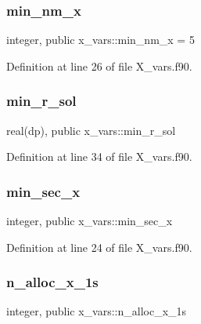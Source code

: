\subsubsection{\texorpdfstring{min\+\_\+nm\+\_\+x}{min\_nm\_x}}
{\footnotesize\ttfamily integer, public x\+\_\+vars\+::min\+\_\+nm\+\_\+x = 5}



Definition at line 26 of file X\+\_\+vars.\+f90.

\mbox{\label{namespacex__vars_a50c610efcf5afa4ec4b0eb7119b5d520}} 
\subsubsection{\texorpdfstring{min\+\_\+r\+\_\+sol}{min\_r\_sol}}
{\footnotesize\ttfamily real(dp), public x\+\_\+vars\+::min\+\_\+r\+\_\+sol}



Definition at line 34 of file X\+\_\+vars.\+f90.

\mbox{\label{namespacex__vars_a0d63825aabc4c71623c6ea7ffe033949}} 
\subsubsection{\texorpdfstring{min\+\_\+sec\+\_\+x}{min\_sec\_x}}
{\footnotesize\ttfamily integer, public x\+\_\+vars\+::min\+\_\+sec\+\_\+x}



Definition at line 24 of file X\+\_\+vars.\+f90.

\mbox{\label{namespacex__vars_af565ad5c65071b130e69d528aa6faf1d}} 
\subsubsection{\texorpdfstring{n\+\_\+alloc\+\_\+x\+\_\+1s}{n\_alloc\_x\_1s}}
{\footnotesize\ttfamily integer, public x\+\_\+vars\+::n\+\_\+alloc\+\_\+x\+\_\+1s}



